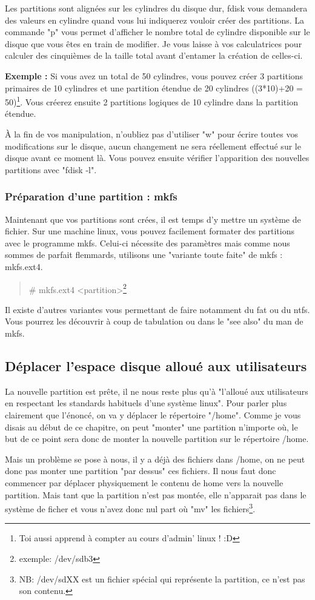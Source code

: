 \documentclass[a4paper]{article}
\newcommand{\commande}[1] {
    \begin{quote}
    \tt\raggedright #1 
    \end{quote}
}
\begin{document}
\par Les partitions sont alignées sur les cylindres du disque dur, fdisk vous demandera des valeurs en cylindre quand vous lui indiquerez vouloir créer des partitions. La commande "p" vous permet d'afficher le nombre total de cylindre disponible sur le disque que vous êtes en train de modifier. Je vous laisse à vos calculatrices pour calculer des cinquièmes de la taille total avant d'entamer la création de celles-ci.
\par \textbf{Exemple :} Si vous avez un total de 50 cylindres, vous pouvez créer 3 partitions primaires de 10 cylindres et une partition étendue de 20 cylindres ((3*10)+20 = 50)\footnote{Toi aussi apprend à compter au cours d'admin' linux ! :D}. Vous créerez ensuite 2 partitions logiques de 10 cylindre dans la partition étendue.
\par À la fin de vos manipulation, n'oubliez pas d'utiliser "w" pour écrire toutes vos modifications sur le disque, aucun changement ne sera réellement effectué sur le disque avant ce moment là. Vous pouvez ensuite vérifier l'apparition des nouvelles partitions avec "fdisk -l".

\subsubsection{Préparation d'une partition : mkfs}
\par Maintenant que vos partitions sont crées, il est temps d'y mettre un système de fichier. Sur une machine linux, vous pouvez facilement formater des partitions avec le programme mkfs. Celui-ci nécessite des paramètres mais comme nous sommes de parfait flemmards, utilisons une "variante toute faite" de mkfs : mkfs.ext4.
\commande{\# mkfs.ext4 <partition>\footnote{exemple: /dev/sdb3}}
\par Il existe d'autres variantes vous permettant de faire notamment du fat ou du ntfs. Vous pourrez les découvrir à coup de tabulation ou dans le "see also" du man de mkfs.

\subsection{Déplacer l'espace disque alloué aux utilisateurs}
\par La nouvelle partition est prête, il ne nous reste plus qu'à "l'alloué aux utilisateurs en respectant les standards habituels d'une système linux". Pour parler plus clairement que l'énoncé, on va y déplacer le répertoire "/home". Comme je vous disais au début de ce chapitre, on peut "monter" une partition n'importe où, le but de ce point sera donc de monter la nouvelle partition sur le répertoire /home.
\par Mais un problème se pose à nous, il y a déjà des fichiers dans /home, on ne peut donc pas monter une partition "par dessus" ces fichiers. Il nous faut donc commencer par déplacer physiquement le contenu de home vers la nouvelle partition. Mais tant que la partition n'est pas montée, elle n'apparait pas dans le système de ficher et vous n'avez donc nul part où "mv" les fichiers\footnote{NB: /dev/sdXX est un fichier spécial qui représente la partition, ce n'est pas son contenu.}.
\end{document}
